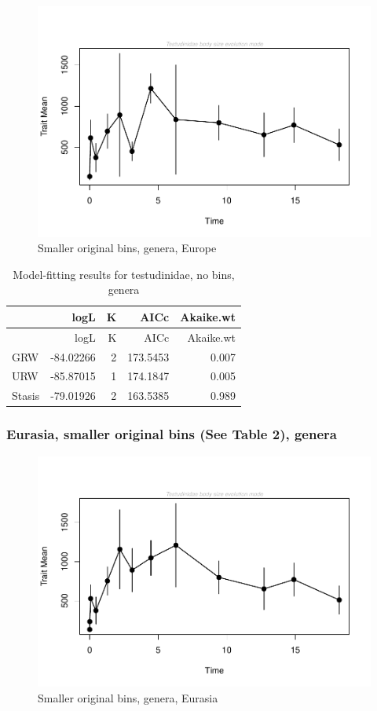 \documentclass[]{article}
\begin{document}
\begin{figure}[htbp]
\centering
\includegraphics{MA_JJ_files/figure-latex/paleoTS with different time bins, no bins, genera, Europe-1.pdf}
\caption{Smaller original bins, genera, Europe}
\end{figure}

\begin{longtable}[]{@{}lrrrr@{}}
\caption{Model-fitting results for testudinidae, no bins,
genera}\tabularnewline
\toprule
& logL & K & AICc & Akaike.wt\tabularnewline
\midrule
\endfirsthead
\toprule
& logL & K & AICc & Akaike.wt\tabularnewline
\midrule
\endhead
GRW & -84.02266 & 2 & 173.5453 & 0.007\tabularnewline
URW & -85.87015 & 1 & 174.1847 & 0.005\tabularnewline
Stasis & -79.01926 & 2 & 163.5385 & 0.989\tabularnewline
\bottomrule
\end{longtable}

\newpage 

\subsubsection{Eurasia, smaller original bins (See Table 2),
genera}\label{eurasia-smaller-original-bins-see-table-2-genera}

\begin{figure}[htbp]
\centering
\includegraphics{MA_JJ_files/figure-latex/paleoTS with different time bins, no bins, genera, Eurasia-1.pdf}
\caption{Smaller original bins, genera, Eurasia}
\end{figure}
\end{document}
